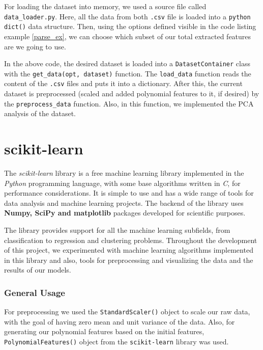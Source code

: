 For loading the dataset into memory, we used a source file called 
\texttt{data\_loader.py}. Here, all the data from both \texttt{.csv} file is loaded 
into a \texttt{python dict()} data structure. Then, using the options defined visible in 
the code listing example \ref{parse_ex}, we can choose which subset of our total extracted 
features are we going to use. 



In the above code, the desired dataset is loaded into a \texttt{DatasetContainer} class 
with the \texttt{get\_data(opt, dataset)} function. The \texttt{load\_data} function 
reads the content of the \texttt{.csv} files and puts it into a dictionary. After 
this, the current dataset is preprocessed (scaled and added polynomial features 
to it, if desired) by the \texttt{preprocess\_data} function. Also, in this function, 
we implemented the PCA analysis of the dataset. 

\section{scikit-learn}

The {\it scikit-learn} library is a free machine learning library implemented in 
the {\it Python} programming language, with some base algorithms written in {\it C}, 
for performance considerations. It is simple to use and has a wide range of 
tools for data analysis and machine learning projects. The backend of the library 
uses {\bf Numpy, SciPy and matplotlib} packages developed for scientific purposes. 

The library provides support for all the machine learning subfields, from 
classification to regression and clustering problems. Throughout the development 
of this project, we experimented with machine learning algorithms implemented 
in this library and also, tools for preprocessing and visualizing the data and 
the results of our models. 

\subsubsection{General Usage}

For preprocessing we used the \texttt{StandardScaler()} object to scale our raw 
data, with the goal of having zero mean and unit variance of the data. Also, for generating 
our polynomial features based on the initial features, 
\texttt{PolynomialFeatures()} object from the \texttt{scikit-learn} library was used. 

